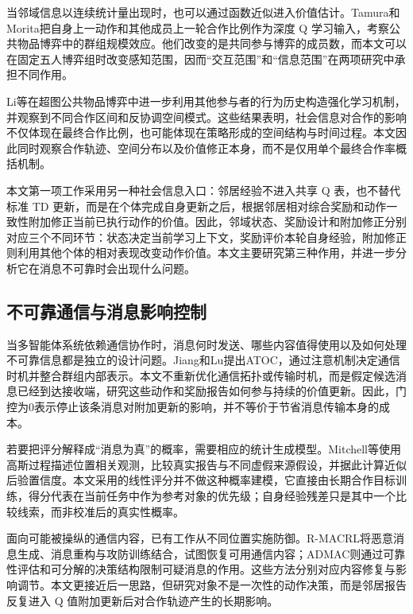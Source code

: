 当邻域信息以连续统计量出现时，也可以通过函数近似进入价值估计。Tamura和Morita把自身上一动作和其他成员上一轮合作比例作为深度 Q 学习输入，考察公共物品博弈中的群组规模效应\cite{tamura2024analysing}。他们改变的是共同参与博弈的成员数，而本文可以在固定五人博弈组时改变感知范围，因而“交互范围”和“信息范围”在两项研究中承担不同作用。

Li等在超图公共物品博弈中进一步利用其他参与者的行为历史构造强化学习机制，并观察到不同合作区间和反协调空间模式\cite{li2025otherregarding}。这些结果表明，社会信息对合作的影响不仅体现在最终合作比例，也可能体现在策略形成的空间结构与时间过程。本文因此同时观察合作轨迹、空间分布以及价值修正本身，而不是仅用单个最终合作率概括机制。

本文第一项工作采用另一种社会信息入口：邻居经验不进入共享 Q 表，也不替代标准 TD 更新，而是在个体完成自身更新之后，根据邻居相对综合奖励和动作一致性附加修正当前已执行动作的价值\cite{kang2025neighbor}。因此，邻域状态、奖励设计和附加修正分别对应三个不同环节：状态决定当前学习上下文，奖励评价本轮自身经验，附加修正则利用其他个体的相对表现改变动作价值。本文主要研究第三种作用，并进一步分析它在消息不可靠时会出现什么问题。

\subsection{不可靠通信与消息影响控制}

当多智能体系统依赖通信协作时，消息何时发送、哪些内容值得使用以及如何处理不可靠信息都是独立的设计问题。Jiang和Lu提出ATOC，通过注意机制决定通信时机并整合群组内部表示\cite{jiang2018attentional}。本文不重新优化通信拓扑或传输时机，而是假定候选消息已经到达接收端，研究这些动作和奖励报告如何参与持续的价值更新。因此，门控为0表示停止该条消息对附加更新的影响，并不等价于节省消息传输本身的成本。

若要把评分解释成“消息为真”的概率，需要相应的统计生成模型。Mitchell等使用高斯过程描述位置相关观测，比较真实报告与不同虚假来源假设，并据此计算近似后验置信度\cite{mitchell2020gaussian}。本文采用的线性评分并不做这种概率建模，它直接由长期合作目标训练，得分代表在当前任务中作为参考对象的优先级；自身经验残差只是其中一个比较线索，而非校准后的真实性概率。

面向可能被操纵的通信内容，已有工作从不同位置实施防御。R-MACRL将恶意消息生成、消息重构与攻防训练结合，试图恢复可用通信内容\cite{xue2022misspoke}；ADMAC则通过可靠性评估和可分解的决策结构限制可疑消息的作用\cite{yu2024admac}。这些方法分别对应内容修复与影响调节。本文更接近后一思路，但研究对象不是一次性的动作决策，而是邻居报告反复进入 Q 值附加更新后对合作轨迹产生的长期影响。

